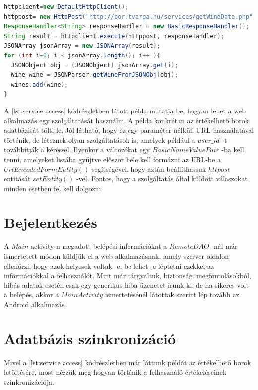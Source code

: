 \documentclass[12pt]{report}
\theoremstyle{definition}
\begin{document}
	\noindent\begin{minipage}{\linewidth}
		\begin{lstlisting}[language=java,label={lst:service access}, caption={Szolgáltatás használat példa}]
httpclient=new DefaultHttpClient();
httppost= new HttpPost("http://bor.tvarga.hu/services/getWineData.php"); // make sure the url is correct.
ResponseHandler<String> responseHandler = new BasicResponseHandler();
String result = httpclient.execute(httppost, responseHandler);
JSONArray jsonArray = new JSONArray(result);
for (int i=0; i < jsonArray.length(); i++ ){
  JSONObject obj = (JSONObject) jsonArray.get(i);
  Wine wine = JSONParser.getWineFromJSONObj(obj);
  wines.add(wine);
}
		\end{lstlisting}
	\end{minipage}
	
	A \ref{lst:service access} kódrészletben látott példa mutatja be, hogyan lehet a web alkalmazás egy szolgáltatását használni. A példa konkrétan az értékelhető borok adatbázisát tölti le. Jól látható, hogy ez egy paraméter nélküli URL használatával történik, de léteznek olyan szolgáltatások is, amelyek például a $user\_id$ -t továbbítják a kéréssel. Ilyenkor a változókat egy $BasicNameValuePair$ -ba kell tenni, amelyeket listába gyűjtve először bele kell formázni az URL-be a $UrlEncodedFormEntity\left(\right)$ segítségével, hogy aztán beállíthassuk $httpost$ entitását $setEntity\left(\right)$ -vel. Fontos, hogy a szolgáltatás által küldött válaszokat minden esetben fel kell dolgozni. 
	
	\section{Bejelentkezés}
	A $Main$ activity-n megadott belépési információkat a $RemoteDAO$ -nál már ismertetett módon küldjük el a web alkalmazásnak, amely szerver oldalon ellenőrzi, hogy azok helyesek voltak -e, be lehet -e léptetni ezekkel az információkkal a felhasználót. Mint már tárgyaltuk, biztonsági megfontolásokból, hibás adatok esetén csak egy generikus hiba üzenetet írunk ki, de ha sikeres volt a belépés, akkor a $Main Activity$ ismertetésénél látottak szerint lép tovább az Android alkalmazás.
	
	\section{Adatbázis szinkronizáció}
	Mivel a \ref{lst:service access} kódrészletben már láttunk példát az értékelhető borok letöltésére, most nézzük meg hogyan történik a felhasználó értékeléseinek szinkronizációja.
	
\end{document}
